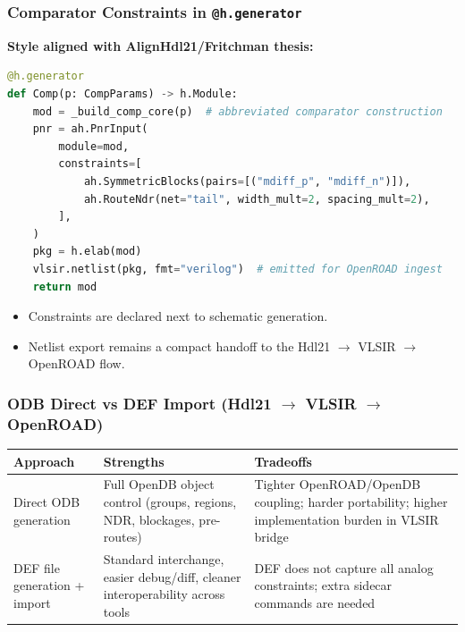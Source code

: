 \begin{frame}[fragile]
  \frametitle{Comparator Constraints in \texttt{@h.generator}}
  \small
  \textbf{Style aligned with AlignHdl21/Fritchman thesis:}
  \begin{lstlisting}[language=Python,basicstyle=\ttfamily\scriptsize]
@h.generator
def Comp(p: CompParams) -> h.Module:
    mod = _build_comp_core(p)  # abbreviated comparator construction
    pnr = ah.PnrInput(
        module=mod,
        constraints=[
            ah.SymmetricBlocks(pairs=[("mdiff_p", "mdiff_n")]),
            ah.RouteNdr(net="tail", width_mult=2, spacing_mult=2),
        ],
    )
    pkg = h.elab(mod)
    vlsir.netlist(pkg, fmt="verilog")  # emitted for OpenROAD ingest
    return mod
  \end{lstlisting}
  \vspace{0.4em}
  \begin{itemize}
    \item Constraints are declared next to schematic generation.
    \item Netlist export remains a compact handoff to the Hdl21 $\rightarrow$ VLSIR $\rightarrow$ OpenROAD flow.
  \end{itemize}
\end{frame}

\begin{frame}
  \frametitle{ODB Direct vs DEF Import (Hdl21 $\rightarrow$ VLSIR $\rightarrow$ OpenROAD)}
  \small
  \begin{center}
    \begin{tabular}{p{2.7cm}|p{4.2cm}|p{4.9cm}}
      \hline
      \textbf{Approach} & \textbf{Strengths} & \textbf{Tradeoffs} \\
      \hline
      Direct ODB generation &
      Full OpenDB object control (groups, regions, NDR, blockages, pre-routes) &
      Tighter OpenROAD/OpenDB coupling; harder portability; higher implementation burden in VLSIR bridge \\
      \hline
      DEF file generation + import &
      Standard interchange, easier debug/diff, cleaner interoperability across tools &
      DEF does not capture all analog constraints; extra sidecar commands are needed \\
      \hline
    \end{tabular}
  \end{center}
  \vspace{0.5em}
\end{frame}

